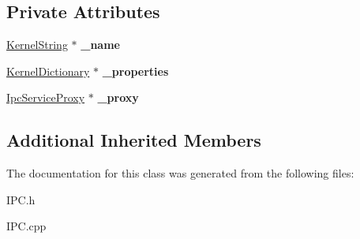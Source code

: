 \subsection*{Private Attributes}
\begin{DoxyCompactItemize}
\item 
\mbox{\label{class_ipc_client_a5f6e0735e640e8eb70dd2a1a67a34054}} 
\hyperlink{class_kernel_string}{Kernel\+String} $\ast$ {\bfseries \+\_\+name}
\item 
\mbox{\label{class_ipc_client_a248f3294d0776fa86736c8bcd5f115a5}} 
\hyperlink{class_kernel_dictionary}{Kernel\+Dictionary} $\ast$ {\bfseries \+\_\+properties}
\item 
\mbox{\label{class_ipc_client_abe19134e532ca8e57834c61b0648415c}} 
\hyperlink{class_ipc_service_proxy}{Ipc\+Service\+Proxy} $\ast$ {\bfseries \+\_\+proxy}
\end{DoxyCompactItemize}
\subsection*{Additional Inherited Members}


The documentation for this class was generated from the following files\+:\begin{DoxyCompactItemize}
\item 
I\+P\+C.\+h\item 
I\+P\+C.\+cpp\end{DoxyCompactItemize}
